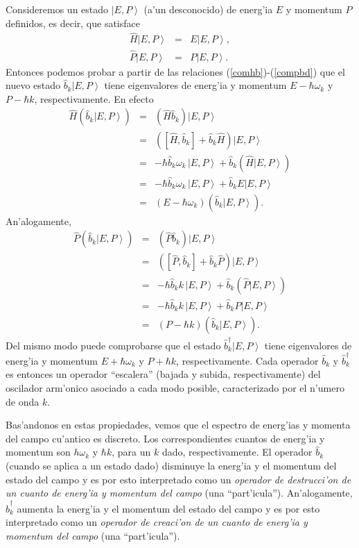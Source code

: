 Consideremos un estado $\left| E,P\right>$ (a'un desconocido) de energ'ia $E$ y
momentum $P$ definidos, es decir, que satisface
\begin{eqnarray}
\hat{H}\left| E,P\right> &=& E \left| E,P\right> ,\\
\hat{P}\left| E,P\right> &=& P \left| E,P\right> .
\end{eqnarray}
Entonces podemos probar a partir de las relaciones (\ref{comhb})-(\ref{compbd})
que el nuevo estado $\hat{b}_k\left| E,P\right>$ tiene eigenvalores de energ'ia
y
momentum $E-\hbar \omega_k$ y $P-\hbar k$, respectivamente. En efecto
\begin{eqnarray}
\hat{H}\left(\hat{b}_k\left| E,P\right>\right)   & = &\left(
\hat{H}\hat{b}_k\right)\left| E,P\right>    \\
& = &\left( \left[ \hat{H},\hat{b}_k\right] +\hat{b}_k\hat{H}\right)\left|
E,P\right>   \\
& = &-\hbar \hat{b}_k \omega_k\, \left| E,P\right> +\hat{b}_k\left(
\hat{H}\left| E,P\right>\right)  \\
& = &-\hbar \hat{b}_k \omega_k\,\left| E,P\right> +\hat{b}_k E\left| E,P\right>
 \\
& = &\left(E- \hbar\omega_k\right) \left( \hat{b}_k \left| E,P\right> \right) .
\end{eqnarray}
An'alogamente,
\begin{eqnarray}
\hat{P}\left(\hat{b}_k\left| E,P\right>\right)   & = &\left(
\hat{P}\hat{b}_k\right)\left| E,P\right>    \\
& = &\left( \left[ \hat{P},\hat{b}_k\right] +\hat{b}_k\hat{P}\right)\left|
E,P\right>   \\
& = &-\hbar \hat{b}_k k\, \left| E,P\right> +\hat{b}_k\left( \hat{P}\left|
E,P\right>\right)  \\
& = &-\hbar \hat{b}_k k\,\left| E,P\right> +\hat{b}_k P\left| E,P\right>   \\
& = &\left(P- \hbar k\right) \left( \hat{b}_k \left| E,P\right> \right) .
\end{eqnarray}
Del mismo modo puede comprobarse que el estado  $\hat{b}^\dagger _k\left|
E,P\right>$ tiene eigenvalores de energ'ia y momentum $E+\hbar \omega_k$ y
$P+\hbar k$, respectivamente. Cada operador $\hat{b}_k$ y $\hat{b}^\dagger _k$
es entonces un operador ``escalera'' (bajada y subida, respectivamente) del
oscilador arm'onico asociado a cada modo posible, caracterizado por el n'umero
de
onda $k$.

Bas'andonos en estas propiedades, vemos que el espectro de energ'ias y momenta
del
campo cu'antico es discreto. Los correspondientes cuantos de energ'ia y
momentum son $h\omega_k$ y $\hbar k$, para un $k$ dado, respectivamente. El
operador $\hat{b}_k$ (cuando se aplica a un estado dado) disminuye la energ'ia y
el momentum del estado del campo y es por esto interpretado como un
\textit{operador de destrucci'on de un cuanto de energ'ia y momentum del campo}
(una ``part'icula''). An'alogamente, $\hat{b}^\dagger _k$ aumenta la energ'ia y
el
momentum del estado del campo y es por esto interpretado como un
\textit{operador de creaci'on de un cuanto de energ'ia y momentum del campo}
(una
``part'icula'').

